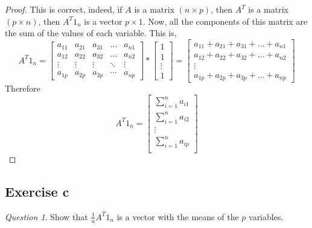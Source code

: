 \documentclass[11pt]{article}
\theoremstyle{definition}
\theoremstyle{remark}
\theoremstyle{remark}
\theoremstyle{remark}
\newtheorem*{question}{Question}
\theoremstyle{proof}
\begin{document}
\begin{proof}
  This is correct, indeed, if $A$ is a matrix $(n \times p)$, then $A^{T}$ is a
  matrix $(p \times n)$, then $A^{T}1_{n}$ is a vector $p \times 1$. Now, all
  the components of this matrix are the sum of the values of each variable. This
  is,
  \[
    A^{T}1_{n} = \begin{bmatrix}
      a_{11} & a_{21} & a_{31} & \ldots & a_{n1}\\
      a_{12}& a_{22}  & a_{32} & \ldots & a_{n2} \\
      \vdots & \vdots & \vdots & \ddots & \vdots \\
      a_{1p} & a_{2p} & a_{3p} & \cdots & a_{np}
    \end{bmatrix} * \begin{bmatrix}
      1\\
      1 \\
      \vdots\\
      1
    \end{bmatrix} = \begin{bmatrix}
      a_{11} + a_{21} + a_{31} + \ldots + a_{n1}\\
      a_{12} + a_{22} + a_{32} + \ldots + a_{n2} \\
      \vdots \\
      a_{1p} + a_{2p} + a_{3p} + \ldots + a_{np}
    \end{bmatrix}
  \]
  Therefore
  \begin{equation*}
    A^{T}1_{n} =
    \begin{bmatrix}
      \displaystyle\sum_{i=1}^{n}a_{i1} \\
      \displaystyle\sum_{i=1}^{n}a_{i2} \\
      \vdots \\
      \displaystyle\sum_{i=1}^{n}a_{ip} \\
    \end{bmatrix}
  \end{equation*}
\end{proof}

\subsection*{Exercise c}
\begin{question}
  Show that $\frac{1}{n}A^{T}1_{n}$ is a vector with the means of the $p$
  variables.
\end{question}
\end{document}

